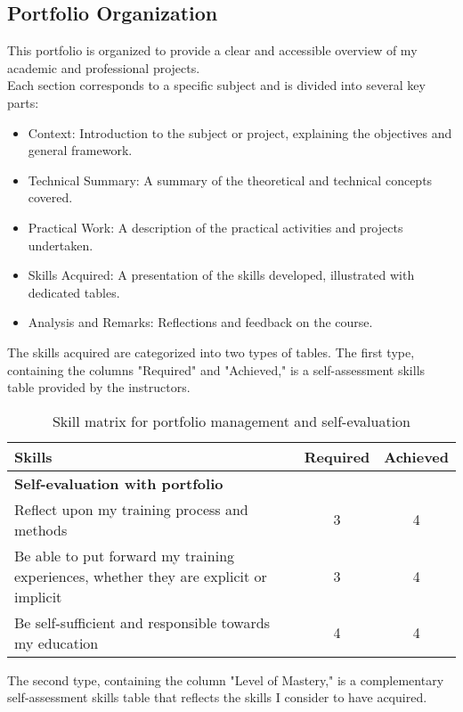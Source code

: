 \subsection*{Portfolio Organization}
This portfolio is organized to provide a clear and accessible overview of my academic and professional projects.\\
Each section corresponds to a specific subject and is divided into several key parts:
\begin{itemize}
    \item Context: Introduction to the subject or project, explaining the objectives and general framework.
    \item Technical Summary: A summary of the theoretical and technical concepts covered.
    \item Practical Work: A description of the practical activities and projects undertaken.
    \item Skills Acquired: A presentation of the skills developed, illustrated with dedicated tables.
    \item Analysis and Remarks: Reflections and feedback on the course.
\end{itemize}

The skills acquired are categorized into two types of tables. The first type, containing the columns "Required" and "Achieved," is a self-assessment skills table provided by the instructors.

\begin{table}[h!]
    \centering
    \renewcommand{\arraystretch}{1.5} %
    \begin{tabular}{|p{11cm}|c|c|}
    \hline
    \rowcolor[gray]{0.8}
    \textbf{Skills} & \textbf{Required} & \textbf{Achieved} \\ \hline
    \rowcolor[gray]{0.9} \textbf{Self-evaluation with portfolio} &  &  \\ \hline
    Reflect upon my training process and methods & 3 & 4 \\ \hline
    Be able to put forward my training experiences, whether they are explicit or implicit & 3 & 4 \\ \hline
    Be self-sufficient and responsible towards my education & 4 & 4 \\ \hline
    \end{tabular}
    \caption{Skill matrix for portfolio management and self-evaluation}
    \label{table:skills}
\end{table}

The second type, containing the column "Level of Mastery," is a complementary self-assessment skills table that reflects the skills I consider to have acquired.
